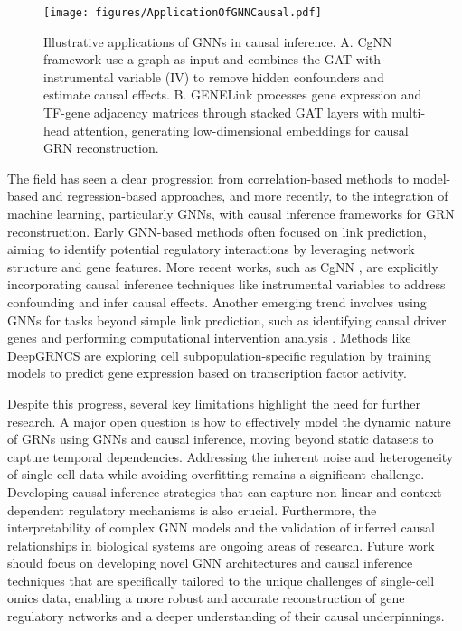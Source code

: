 \begin{figure}[htbp]
    \centering
    \texttt{[image: figures/ApplicationOfGNNCausal.pdf]}
    \caption{
        Illustrative applications of GNNs in causal inference.
        A. CgNN framework use a graph as input and combines the GAT with instrumental variable (IV) to remove hidden confounders and estimate causal effects.
        B. GENELink processes gene expression and TF-gene adjacency matrices through stacked GAT layers with multi-head attention, generating low-dimensional embeddings for causal GRN reconstruction.
    }
    \label{fig:application}
\end{figure}

The field has seen a clear progression from correlation-based methods to model-based and regression-based approaches, and more recently, to the integration of machine learning, particularly GNNs, with causal inference frameworks for GRN reconstruction. Early GNN-based methods often focused on link prediction, aiming to identify potential regulatory interactions by leveraging network structure and gene features. More recent works, such as CgNN \cite{du2024causal}, are explicitly incorporating causal inference techniques like instrumental variables to address confounding and infer causal effects. Another emerging trend involves using GNNs for tasks beyond simple link prediction, such as identifying causal driver genes and performing computational intervention analysis \cite{tejada2023causal,deshpande2022network}. Methods like DeepGRNCS \cite{lei2024deepgrncs} are exploring cell subpopulation-specific regulation by training models to predict gene expression based on transcription factor activity.

Despite this progress, several key limitations highlight the need for further research. A major open question is how to effectively model the dynamic nature of GRNs using GNNs and causal inference, moving beyond static datasets to capture temporal dependencies. Addressing the inherent noise and heterogeneity of single-cell data while avoiding overfitting remains a significant challenge. Developing causal inference strategies that can capture non-linear and context-dependent regulatory mechanisms is also crucial. Furthermore, the interpretability of complex GNN models and the validation of inferred causal relationships in biological systems are ongoing areas of research. Future work should focus on developing novel GNN architectures and causal inference techniques that are specifically tailored to the unique challenges of single-cell omics data, enabling a more robust and accurate reconstruction of gene regulatory networks and a deeper understanding of their causal underpinnings.

